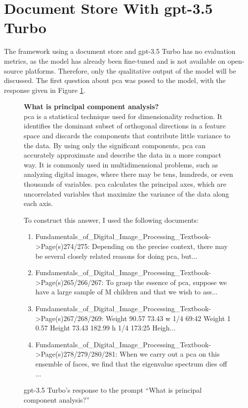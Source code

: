 \section{Document Store With \acrshort{gpt}-3.5 Turbo}\label{sec:results_gpt_turbo}
The framework using a document store and \acrshort{gpt}-3.5 Turbo has no evaluation metrics, as the model has already been fine-tuned and is not available on open-source platforms. Therefore, only the qualitative output of the model will be discussed. The first question about \acrshort{pca} was posed to the model, with the response given in Figure \ref{fig:results_gpt_ex1}.

\begin{figure}[h]
    \begin{itquote}
        \textbf{What is principal component analysis?} \\
        \acrfull{pca} is a statistical technique used for dimensionality reduction. It identifies the dominant subset of orthogonal directions in a feature space and discards the components that contribute little variance to the data. By using only the significant components, \acrshort{pca} can accurately approximate and describe the data in a more compact way. It is commonly used in multidimensional problems, such as analyzing digital images, where there may be tens, hundreds, or even thousands of variables. \acrshort{pca} calculates the principal axes, which are uncorrelated variables
        that maximize the variance of the data along each axis.
        
        To construct this answer, I used the following documents:
           
        \begin{enumerate}
            \item Fundamentals\_of\_Digital\_Image\_Processing\_Textbook->Page(s)274/275:  Depending on the precise context, there may be several closely related reasons for doing  \acrshort{pca}, but...
            \item Fundamentals\_of\_Digital\_Image\_Processing\_Textbook->Page(s)265/266/267:  To grasp the essence of \acrshort{pca}, suppose we have a large sample of M children and that we wish  to ass...
            \item Fundamentals\_of\_Digital\_Image\_Processing\_Textbook->Page(s)267/268/269:  Weight  90.57  73.43  w 1/4  69:42  Weight  1  0.57  Height  73.43  182.99  h  1/4  173:25  Heigh...
            \item Fundamentals\_of\_Digital\_Image\_Processing\_Textbook->Page(s)278/279/280/281:  When we carry out a \acrshort{pca} on this ensemble of faces, we find that the eigenvalue spectrum  dies off ...
        \end{enumerate}
    \end{itquote}
    \caption{\acrshort{gpt}-3.5 Turbo's response to the prompt ``What is principal component analysis?''}
    \label{fig:results_gpt_ex1}
\end{figure}

